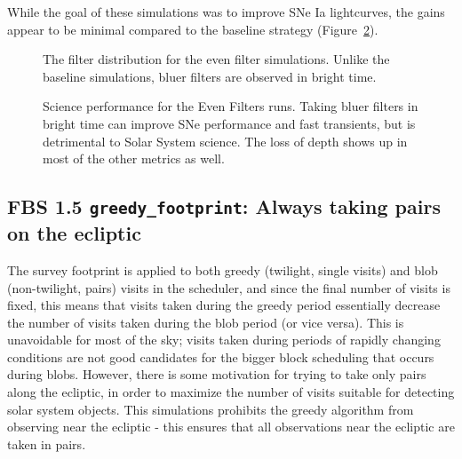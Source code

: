 While the goal of these simulations was to improve SNe Ia lightcurves, the gains appear to be minimal compared to the baseline strategy (Figure~\ref{fig:even_filt_radar}). 


\begin{figure}
\caption{The filter distribution for the even filter simulations. Unlike the baseline simulations, bluer filters are observed in bright time.}
\label{fig:even_filt_hourglass}
\end{figure}


\begin{figure}
\caption{Science performance for the Even Filters runs.  Taking bluer filters in bright time can improve SNe performance and fast transients, but is detrimental to Solar System science.  The loss of depth shows up in most of the other metrics as well.}
\label{fig:even_filt_radar}
\end{figure}


\subsection{FBS 1.5 {\tt greedy\_footprint}: Always taking pairs on the ecliptic}

The survey footprint is applied to both greedy (twilight, single visits) and blob (non-twilight, pairs) visits in the scheduler, and since the final number of visits is fixed, this means that visits taken during the greedy period essentially decrease the number of visits taken during the blob period (or vice versa). This is unavoidable for most of the sky; visits taken during periods of rapidly changing conditions are not good candidates for the bigger block scheduling that occurs during blobs. However, there is some motivation for trying to take only pairs along the ecliptic, in order to maximize the number of visits suitable for detecting solar system objects. This simulations prohibits the greedy algorithm from observing near the ecliptic - this ensures that all observations near the ecliptic are taken in pairs. 

